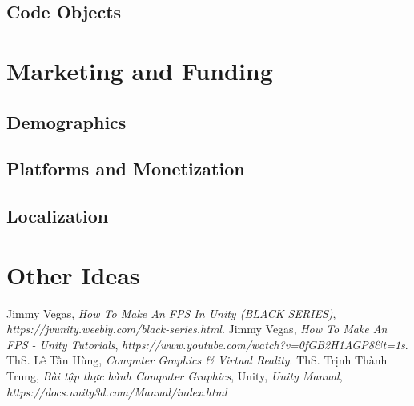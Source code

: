 \documentclass[14pt,a4paper]{extreport}
\begin{document}
\section{Code Objects}


\chapter{Marketing and Funding}
\section{Demographics}
\section{Platforms and Monetization}
\section{Localization}

\chapter{Other Ideas}

\begin{thebibliography}{widestlabel}
	 Jimmy Vegas, \textit{How To Make An FPS In Unity
	(BLACK SERIES)}, \textit{https://jvunity.weebly.com/black-series.html}.
	 Jimmy Vegas, \textit{How To Make An FPS - Unity Tutorials}, \textit{https://www.youtube.com/watch?v=0fGB2H1AGP8\&t=1s}.
	 ThS. Lê Tấn Hùng, \textit{Computer Graphics \& Virtual Reality}.
	 ThS. Trịnh Thành Trung, \textit{Bài tập thực hành Computer Graphics}, 
	 Unity, \textit{Unity Manual}, \textit{https://docs.unity3d.com/Manual/index.html}
\end{thebibliography}
\end{document}
